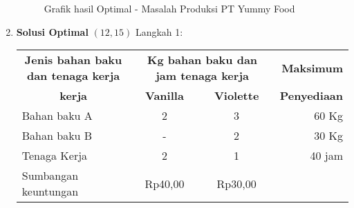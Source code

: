 \documentclass[12pt,a4paper]{article}
\begin{document}
\begin{enumerate}
\begin{figure}[H]
    \caption{Grafik hasil Optimal - Masalah Produksi PT Yummy Food}
    \end{figure}

\item \textbf{Solusi Optimal} $(12,15)$
    Langkah 1: \\
  \begin{table}[h!]
      \centering
      \begin{tabular}{lcccr}
          \toprule
          \multicolumn{2}{c}{\textbf{Jenis bahan baku dan tenaga kerja}} & \multicolumn{2}{c}{\textbf{Kg bahan baku dan jam tenaga kerja}} & \textbf{Maksimum} \\
          \cmidrule(lr){1-2} \cmidrule(lr){3-4} \cmidrule(l){5}
          \multicolumn{2}{c}{\textbf{kerja}} & \textbf{Vanilla} & \textbf{Violette} & \textbf{Penyediaan} \\
          \midrule
          \multicolumn{2}{l}{Bahan baku A} & 2 & 3 & 60 Kg \\
          \multicolumn{2}{l}{Bahan baku B} & - & 2 & 30 Kg \\
          \multicolumn{2}{l}{Tenaga Kerja} & 2 & 1 & 40 jam \\
          \midrule
          \multicolumn{2}{l}{Sumbangan keuntungan} & Rp40,00 & Rp30,00 & \\
          \bottomrule
      \end{tabular}
  \end{table}


\end{enumerate}
\end{document}

